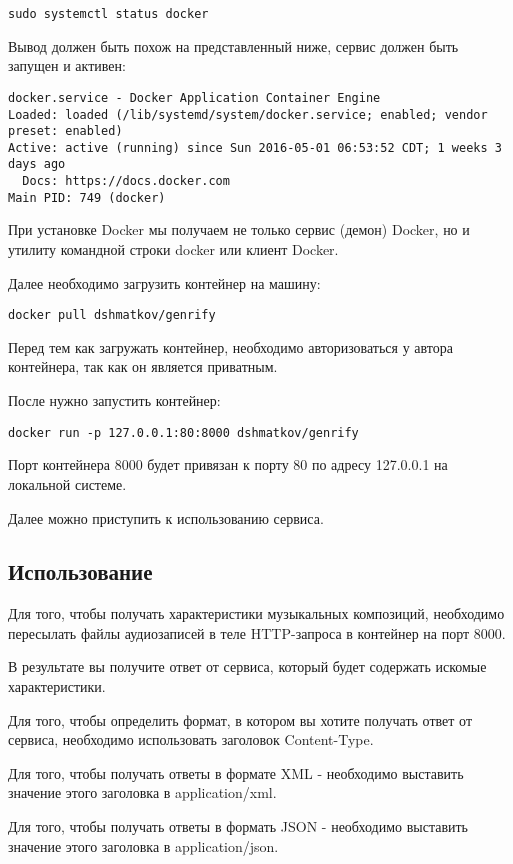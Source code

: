 \begin{lstlisting}
sudo systemctl status docker
\end{lstlisting}

Вывод должен быть похож на представленный ниже, сервис должен быть запущен и активен:

\begin{lstlisting}
docker.service - Docker Application Container Engine
Loaded: loaded (/lib/systemd/system/docker.service; enabled; vendor preset: enabled)
Active: active (running) since Sun 2016-05-01 06:53:52 CDT; 1 weeks 3 days ago
  Docs: https://docs.docker.com
Main PID: 749 (docker)
\end{lstlisting}

При установке Docker мы получаем не только сервис (демон) Docker, но и утилиту командной строки docker или клиент Docker.

Далее необходимо загрузить контейнер на машину:

\begin{lstlisting}
docker pull dshmatkov/genrify
\end{lstlisting}

Перед тем как загружать контейнер, необходимо авторизоваться у автора контейнера, так как он является приватным.

После нужно запустить контейнер:

\begin{lstlisting}
docker run -p 127.0.0.1:80:8000 dshmatkov/genrify
\end{lstlisting}

Порт контейнера 8000 будет привязан к порту 80 по адресу 127.0.0.1 на локальной системе.

Далее можно приступить к использованию сервиса.

\subsection{Использование}
\label{sec:manual:usage}

Для того, чтобы получать характеристики музыкальных композиций, необходимо пересылать файлы аудиозаписей в теле HTTP-запроса в контейнер на порт 8000.

В результате вы получите ответ от сервиса, который будет содержать искомые характеристики.

Для того, чтобы определить формат, в котором вы хотите получать ответ от сервиса, необходимо использовать заголовок Content-Type.

Для того, чтобы получать ответы в формате XML - необходимо выставить значение этого заголовка в application/xml.

Для того, чтобы получать ответы в формать JSON - необходимо выставить значение этого заголовка в application/json.

